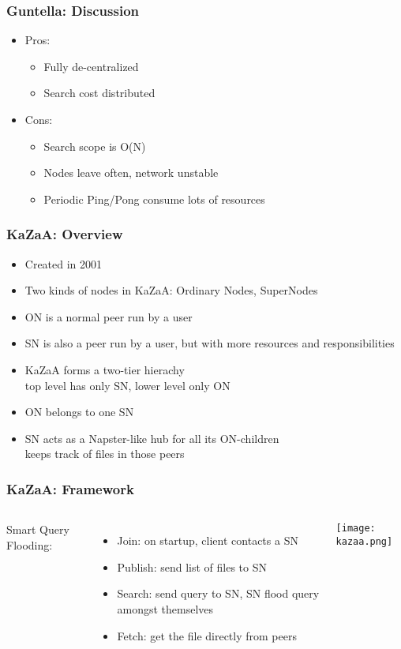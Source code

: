 \begin{frame}
    \frametitle{Guntella: Discussion}
    \begin{itemize}
        \item Pros:
        \begin{itemize}
            \item Fully de-centralized
            \item Search cost distributed
        \end{itemize}
        \item Cons:
        \begin{itemize}
            \item Search scope is O(N)
            \item Nodes leave often, network unstable
            \item Periodic Ping/Pong consume lots of resources
        \end{itemize}
    \end{itemize}
\end{frame}

\begin{frame}
    \frametitle{KaZaA: Overview}
    \begin{itemize}
        \item Created in 2001
        \item Two kinds of nodes in KaZaA: \alert{Ordinary Nodes}, \alert{SuperNodes}
        \item ON is a normal peer run by a user
        \item SN is also a peer run by a user, but with more resources and responsibilities
        \item KaZaA forms a two-tier hierachy \\
            top level has only SN, lower level only ON
        \item ON belongs to one SN
        \item SN acts as a Napster-like hub for all its ON-children \\
            keeps track of files in those peers
    \end{itemize}
\end{frame}

\begin{frame}
    \frametitle{KaZaA: Framework}
    \begin{columns}
        Smart Query Flooding:
        \begin{itemize}
            \item Join: on startup, client contacts a SN
            \item Publish: send list of files to SN
            \item Search: send query to SN, SN flood query amongst themselves
            \item Fetch: get the file directly from peers
        \end{itemize}
            \texttt{[image: kazaa.png]}
    \end{columns}
\end{frame}

